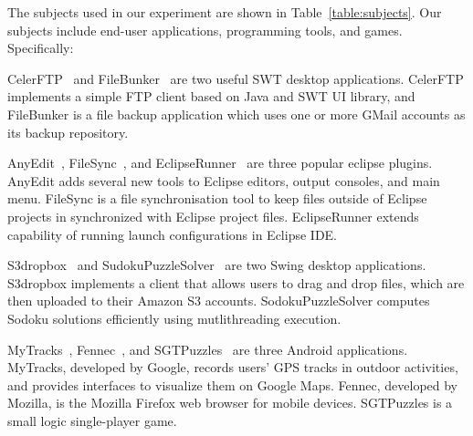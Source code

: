 The subjects used in our experiment are shown in Table~\ref{table:subjects}. Our
subjects include end-user applications, programming tools, and games. Specifically:

\begin{itemize}
\Item CelerFTP~\cite{celer} and FileBunker~\cite{filebunker} are two useful
SWT desktop applications.
CelerFTP implements a simple FTP client based on Java and SWT UI library, and
FileBunker is a file backup application which uses one or more GMail accounts as its backup repository.

\Item  AnyEdit~\cite{anyedit}, FileSync~\cite{filesync}, and
EclipseRunner~\cite{eclipserunner} are three popular eclipse plugins.
AnyEdit adds several new tools to  Eclipse editors, output consoles, and main menu. 
FileSync is a file synchronisation tool to keep files outside of Eclipse projects in synchronized
with Eclipse project files. EclipseRunner extends capability of running launch configurations in Eclipse IDE.

\Item  S3dropbox~\cite{s3dropbox} and SudokuPuzzleSolver~\cite{sudokusolver}
are two Swing desktop applications. S3dropbox implements a client that allows users
to drag and drop files, which are then uploaded to their Amazon S3 accounts. SodokuPuzzleSolver
computes Sodoku solutions efficiently using mutlithreading execution. 

\Item  MyTracks~\cite{mytracks}, Fennec~\cite{fennec},
and SGTPuzzles~\cite{sgtpuzzles} are three Android applications.
MyTracks, developed by Google, records users' GPS tracks in outdoor activities, and provides
interfaces to visualize them on Google Maps. Fennec, developed by Mozilla, is the Mozilla
Firefox web browser for mobile devices. SGTPuzzles is a small logic single-player game.

\end{itemize}


